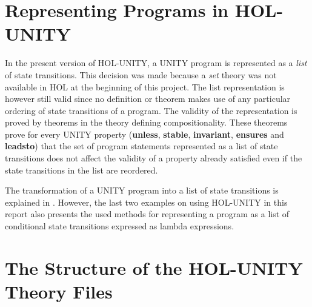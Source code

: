 \section{Representing Programs in HOL-UNITY}

In the present version of HOL-UNITY, a UNITY program is represented as a {\it
list} of state transitions.  This decision was made because a {\it set} theory
was not available in HOL at the beginning of this project.  The list
representation is however still valid since no definition or theorem makes use
of any particular ordering of state transitions of a program.  The validity of
the representation is proved by theorems in the theory defining
compositionality.  These theorems prove for every UNITY property ({\bf unless},
{\bf stable}, {\bf invariant}, {\bf ensures} and {\bf leadsto}) that the
set of program statements represented as a list of state transitions does not
affect the validity of a property already satisfied even if the state
transitions in the list are reordered.

The transformation of a UNITY program into a list of state transitions is
explained in \cite{FA92}.  However, the last two examples on using HOL-UNITY in
this report also presents the used methods for representing a program as a list
of conditional state transitions expressed as lambda expressions.

\newpage
\section{The Structure of the HOL-UNITY Theory Files}

